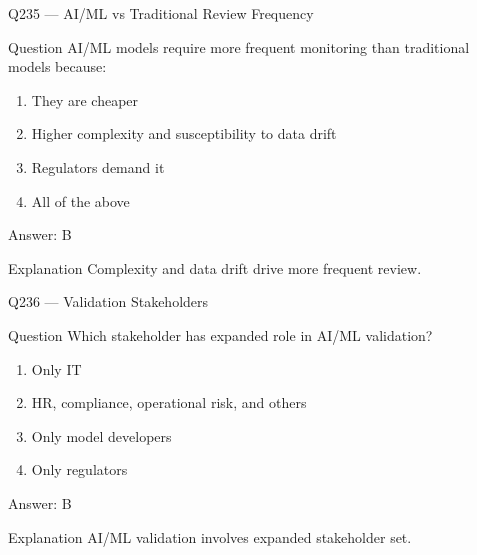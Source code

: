 \documentclass[aspectratio=169,8pt]{beamer}
\begin{document}
								\begin{frame}{Q235 --- AI/ML vs Traditional Review Frequency}
									\begin{block}{Question}
										AI/ML models require more frequent monitoring than traditional models because:
										\begin{enumerate}
											\item They are cheaper
											\item Higher complexity and susceptibility to data drift
											\item Regulators demand it
											\item All of the above
										\end{enumerate}
									\end{block}
									\begin{exampleblock}{Answer: B}\end{exampleblock}
									\begin{block}{Explanation}
										Complexity and data drift drive more frequent review.
									\end{block}
								\end{frame}
								
								\begin{frame}{Q236 --- Validation Stakeholders}
									\begin{block}{Question}
										Which stakeholder has expanded role in AI/ML validation?
										\begin{enumerate}
											\item Only IT
											\item HR, compliance, operational risk, and others
											\item Only model developers
											\item Only regulators
										\end{enumerate}
									\end{block}
									\begin{exampleblock}{Answer: B}\end{exampleblock}
									\begin{block}{Explanation}
										AI/ML validation involves expanded stakeholder set.
									\end{block}
								\end{frame}
								
\end{document}
